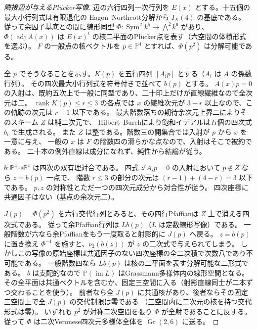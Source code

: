 \begin{proof}[隣接辺が与えるPlücker写像]
辺の六行四列一次行列を $E(x)$ とする。十五個の最大小行列式は有限退化の
Eagon--Northcott分解から $I_X(4)$ の基底である。
従って余因子基底との間に線形同型
$\Phi:\operatorname{Sym}^2 k^5\longrightarrow\bigwedge^2 k^6$ があり、
$\Phi(\operatorname{adj}A(x))$ は $E(x)^t$ の核二平面のPlücker点を表す（六空間の体積形式を選ぶ）。
$F$ の一般点の核ベクトルを $p\in\mathbb P^4$ とすれば、$\Phi(p^2)$ は分解可能である。

全 $p$ でそうなることを示す。$K(p)$ を五行四列 $[A_i p]$ とする（$A_i$ は $A$ の係数行列）。
その四次最大小行列式を符号付きで並べて $b(p)$ とする。
$A(x)p=0$ の入射は、既約五次上で一般に同型であり、二十印上だけが直線繊維なので全次元は二。
$\operatorname{rank}K(p)\le r\le3$ の各点では $x$ の繊維次元が $3-r$ 以上なので、この軌跡の次元は $r-1$ 以下である。
最大階数落ちの期待余次元上界二によりそのスキーム $Z$ は純二次元で、
Hilbert--Burchにより飽和イデアルは五個の四次式 $b_i$ で生成される。
また $Z$ は整である。階数三の開集合では入射が $p$ から $x$ を一意に与え、
一般の $x$ は $F$ の階数四の滑らかな点なので、入射はそこで被約である。
二十本の例外直線は成分になれず、純性から結論が従う。

$b:\mathbb P^4\dashrightarrow\mathbb P^4$ は四次の双有理対合である。
四式 $z^t A_i p=0$ の入射において $p\notin Z$ なら $z=b(p)$ 一点で、
階数 $r\le3$ の部分の次元は $(r-1)+(4-r)=3$ 以下である。
$p,z$ の対称性とただ一つの四次元成分から対合性が従う。
四次座標に共通因子はない（基点の余次元二）。

$J(p)=\Phi(p^2)$ を六行交代行列とみると、その四行Pfaffianは $Z$ 上で消える四次式である。
従って余Pfaffian行列は $L b(p)$（$L$ は定数線形写像）である。
一般階数が六なら余Pfaffianをもう一度取ると射影的に $J(p)$ へ戻る。
$z=b(p)$ に置き換え $\Phi^{-1}$ を施すと、$\nu_2(b(z))$ が $z$ の二次式で与えられてしまう。
しかしこの写像の原始座標は共通因子のない四次座標の全二次積で次数八であり不可能である。
一般階数四なら $L b(p)$ は核の二平面を表す分解可能な二形式である。
$b$ は支配的なので $\mathbb P(\operatorname{im} L)$ はGrassmann多様体内の線形空間となる。
その全平面は共通ベクトルを含むか、固定三空間に入る（射影直線同士が二本ずつ交わることを使う）。
前者なら全 $J(p)$ に共通核があり、後者ならその固定三空間上で全 $J(p)$ の交代制限は零である
（三空間内に二次元の核を持つ交代形式は零）。
いずれも $p^2$ が対称二次空間を張り $\Phi$ が全射であることに反する。
従って $\Phi$ は二次Veronese四次元多様体全体を $\operatorname{Gr}(2,6)$ に送る。
\end{proof}

